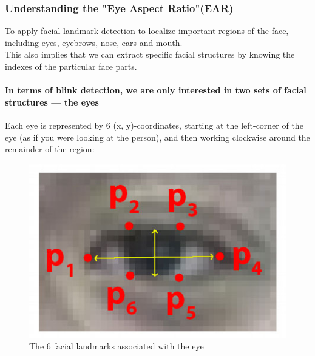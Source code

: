         \subsubsection{Understanding the "Eye Aspect Ratio"(EAR)}
            To apply facial landmark detection to localize important regions of the face, including eyes, eyebrows, nose, ears and mouth. \\
            \vspace{3mm}
            This also implies that we can extract specific facial structures by knowing the indexes of the particular face parts.
            \paragraph{In terms of blink detection, we are only interested in two sets of facial structures — the eyes}
                Each eye is represented by 6 (x, y)-coordinates, starting at the left-corner of the eye (as if you were looking at the person), and then working clockwise around the remainder of the region: 
                \begin{figure}[H]
                    \centering
                    \includegraphics[width=0.6\linewidth]{img/eye.png}
                    \caption{The 6 facial landmarks associated with the eye}
                \end{figure}
